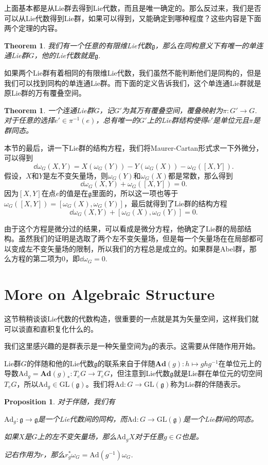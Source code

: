 \documentclass[8pt]{book}
\theoremstyle{plain}
\newtheorem{pro}[defi]{Proposition}
\newtheorem{theo}[defi]{Theorem}
\newcommand{\lag}{{\mathfrak{g}}}  %
\begin{document}
上面基本都是从Lie群去得到Lie代数，而且是唯一确定的。那么反过来，我们是否可以从Lie代数得到Lie群，如果可以得到，又能确定到哪种程度？这些内容是下面两个定理的内容。
\begin{theo}
我们有一个任意的有限维Lie代数$\lag$，那么在同构意义下有唯一的单连通Lie群$G$，他的Lie代数就是$\lag$.
\end{theo}
如果两个Lie群有着相同的有限维Lie代数，我们虽然不能判断他们是同构的，但是我们可以找到同构的单连通Lie群。而下面的定义告诉我们，这个单连通Lie群就是原Lie群的万有覆叠空间。
\begin{theo}
一个连通Lie群$G$，记$G'$为其万有覆叠空间，覆叠映射为$\pi:G'\to G$.对于任意的选择$e'\in \pi^{−1}(e)$，总有唯一的$G'$上的Lie群结构使得$e'$是单位元且$\pi$是群同态。
\end{theo}

本节的最后，讲一下Lie群的结构方程，我们将Maurer-Cartan形式求一下外微分，可以得到
\[
\dd \omega_G(X,Y)=X(\omega_G(Y))-Y(\omega_G(X))-\omega_G([X,Y]).
\]
假设，$X$和$Y$是左不变矢量场，则$\omega_G(Y)$和$\omega_G(X)$都是常数，那么得到
\[
\dd \omega_G(X,Y)+\omega_G([X,Y])=0.
\]
因为$[X,Y]$在点$e$的值是在$\lag$里面的，所以这一项也等于$\omega_G([X,Y])=[\omega_G(X),\omega_G(Y)]$，最后就得到了Lie群的结构方程
\[
\dd \omega_G(X,Y)+[\omega_G(X),\omega_G(Y)]=0.
\]

由于这个方程是微分过的结果，可以看成是微分方程，他确定了Lie群的局部结构。虽然我们的证明是选取了两个左不变矢量场，但是每一个矢量场在在局部都可以变成左不变矢量场的限制，所以我们的方程总是成立的。如果群是Abel群，那么方程的第二项为0，即$\dd \omega_G=0$.

\section{More on Algebraic Structure}
这节稍稍谈谈Lie代数的代数构造，很重要的一点就是其为矢量空间，这样我们就可以谈直和直积复化什么的。

我们这里感兴趣的是群表示是一种矢量空间为$\lag$的表示。这需要从伴随作用开始。

Lie群$G$的伴随和他的Lie代数$\lag$的联系来自于伴随$\mathbf{Ad}(g):h\mapsto ghg^{-1}$在单位元上的导数$\mathrm{Ad}_g=\mathbf{Ad}(g)_*:T_eG\to T_eG$，但注意到Lie代数$\lag$就是Lie群在单位元的切空间$T_eG$，所以$\mathrm{Ad}_g\in \mathrm{GL}(\lag)$。我们将$\mathrm{Ad}:G\to \mathrm{GL}(\lag)$称为Lie群的伴随表示。

\begin{pro}对于伴随，我们有

 $\mathrm{Ad}_g:\lag\to \lag$是一个Lie代数间的同构，而$\mathrm{Ad}:G\to \mathrm{GL}(\lag)$是一个Lie群间的同态。

 如果$X$是$G$上的左不变矢量场，那么$\mathrm{Ad}_gX$对于任意$g\in G$也是。

 记右作用为$r$，那么$r_g^*\omega_G=\mathrm{Ad}(g^{-1})\omega_G$.
\end{pro}
\end{document}
